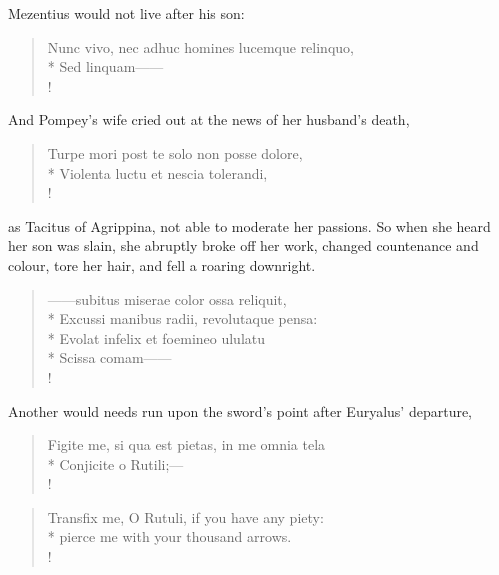 {Mezentius would not live after his son:

\begin{latin}
\begin{verse}%
Nunc vivo, nec adhuc homines lucemque relinquo,\\*
Sed linquam------\\!
\end{verse}%
\end{latin}

And Pompey's wife cried out at the news of her husband's death,

\begin{latin}
\begin{verse}%
Turpe mori post te solo non posse dolore,\\*
Violenta luctu et nescia tolerandi,\\!
\end{verse}%
\end{latin}

as Tacitus of Agrippina, not able to moderate her passions. So when she heard her son was slain, she abruptly broke off her work, changed countenance and colour, tore her hair, and fell a roaring downright.

\begin{latin}
\begin{verse}%
------subitus miserae color ossa reliquit,\\*
Excussi manibus radii, revolutaque pensa:\\*
Evolat infelix et foemineo ululatu\\*
Scissa comam------\\!
\end{verse}%
\end{latin}

Another would needs run upon the sword's point after Euryalus' departure,

%
\begin{latin}%
\begin{verse}%
Figite me, si qua est pietas, in me omnia tela\\*
Conjicite o Rutili;---\\!
\end{verse}%
\end{latin}%
\translationrule%
\begin{verse}%
Transfix me, O Rutuli, if you have any piety:\\*
pierce me with your thousand arrows.\\!
\end{verse}%

}
